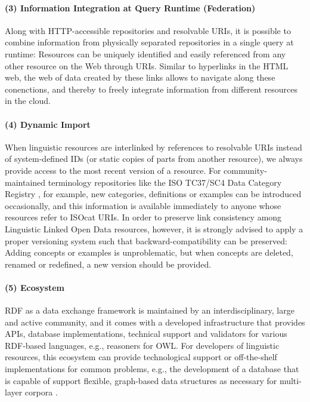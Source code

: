 \smallskip\noindent
\paragraph{(3) Information Integration at Query Runtime (Federation)}
Along with HTTP-accessible repositories and resolvable URIs, it is possible to combine information from physically separated  repositories in a single query at runtime: 
Resources can be uniquely identified and easily referenced from any other resource on the Web through URIs. 
Similar to hyperlinks in the HTML web, the web of data created by these links allows to navigate along these conenctions, 
and thereby to freely integrate information from different resources in the cloud.

\smallskip\noindent
\paragraph{(4) Dynamic Import}
When linguistic resources are interlinked by references to resolvable URIs instead of system-defined IDs (or static copies of parts from another resource), we always provide access to the most recent version of a resource. 
For community-maintained terminology repositories like the ISO TC37/SC4 Data Category Registry \citep[ISOcat]{wright2004global,windhouwer-wright2012}, for example, new categories, definitions or examples can be introduced occasionally, and this information is available immediately to anyone whose resources refer to ISOcat URIs. 
In order to preserve link consistency among Linguistic Linked Open Data resources, however, it is strongly advised to apply a proper versioning system such that backward-compatibility can be preserved: Adding concepts or examples is unproblematic, but when concepts are deleted, renamed or redefined, a new version should be provided.

\smallskip\noindent
\paragraph{(5) Ecosystem}
RDF as a data exchange framework is maintained by an interdisciplinary, large and active community, and it comes with a developed infrastructure that provides APIs, database implementations, technical support and va\-li\-da\-tors for various RDF-based languages, e.g., reasoners for OWL. For developers of linguistic resources, this ecosystem can provide technological support or off-the-shelf implementations for common problems, e.g., the de\-ve\-lop\-ment of a database that is capable of support flexible, graph-based data structures as necessary for multi-layer corpora \citep{ide-suderman07-graf}.


